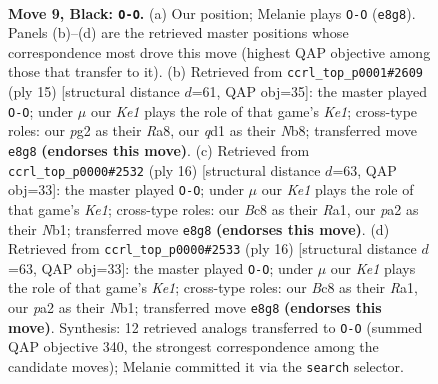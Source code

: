 \documentclass[11pt]{article}
\begin{document}
\clearpage

\begin{figure}[p]\centering
\begin{subfigure}{0.46\textwidth}\centering
\resizebox{\linewidth}{!}{%
\newchessgame
\chessboard[
  setfen={rnbqk2r/pp3pbp/1n1pp1p1/8/3P4/1B6/PPP2PPP/RNBQNRK1 b kq - 1 9},
  showmover=false,
  pgfstyle=straightmove, color=movearrow, markmove={e8-g8}
]}
\caption{}
\end{subfigure}\hfill
\begin{subfigure}{0.46\textwidth}\centering
\resizebox{\linewidth}{!}{%
\newchessgame
\chessboard[
  setfen={rn1qk2r/pp2bppp/2pp1n2/4p3/2P5/2N2BPP/PPQPPP2/R1B1K2R b KQkq - 0 8},
  showmover=false,
  pgfstyle=straightmove, color=movearrow, markmove={e8-g8}
]}
\caption{}
\end{subfigure}
\\[4pt]
\begin{subfigure}{0.46\textwidth}\centering
\resizebox{\linewidth}{!}{%
\newchessgame
\chessboard[
  setfen={rn1qkb1r/pb1p1ppp/1p6/2pn4/8/5NP1/PPQ1PPBP/RNB1K2R w KQkq - 0 9},
  showmover=false,
  pgfstyle=straightmove, color=movearrow, markmove={e1-g1}
]}
\caption{}
\end{subfigure}\hfill
\begin{subfigure}{0.46\textwidth}\centering
\resizebox{\linewidth}{!}{%
\newchessgame
\chessboard[
  setfen={rn1qkb1r/pb1p1ppp/1p6/2pn4/8/5NP1/PPQ1PPBP/RNB1K2R w KQkq - 0 9},
  showmover=false,
  pgfstyle=straightmove, color=movearrow, markmove={e1-g1}
]}
\caption{}
\end{subfigure}
\caption{\textbf{Move 9, Black: \texttt{O-O}.} (a) Our position; Melanie plays \texttt{O-O} (\texttt{e8g8}). Panels (b)--(d) are the retrieved master positions whose correspondence most drove this move (highest QAP objective among those that transfer to it). (b) Retrieved from \texttt{ccrl\_top\_p0001\#2609} (ply 15) [structural distance $d$=61, QAP obj=35]: the master played \texttt{O-O}; under $\mu$ our \emph{Ke1} plays the role of that game's \emph{Ke1}; cross-type roles: our \emph{p}g2 as their \emph{R}a8, our \emph{q}d1 as their \emph{N}b8; transferred move \texttt{e8g8} \textbf{(endorses this move)}. (c) Retrieved from \texttt{ccrl\_top\_p0000\#2532} (ply 16) [structural distance $d$=63, QAP obj=33]: the master played \texttt{O-O}; under $\mu$ our \emph{Ke1} plays the role of that game's \emph{Ke1}; cross-type roles: our \emph{B}c8 as their \emph{R}a1, our \emph{p}a2 as their \emph{N}b1; transferred move \texttt{e8g8} \textbf{(endorses this move)}. (d) Retrieved from \texttt{ccrl\_top\_p0000\#2533} (ply 16) [structural distance $d$=63, QAP obj=33]: the master played \texttt{O-O}; under $\mu$ our \emph{Ke1} plays the role of that game's \emph{Ke1}; cross-type roles: our \emph{B}c8 as their \emph{R}a1, our \emph{p}a2 as their \emph{N}b1; transferred move \texttt{e8g8} \textbf{(endorses this move)}. Synthesis: 12 retrieved analogs transferred to \texttt{O-O} (summed QAP objective 340, the strongest correspondence among the candidate moves); Melanie committed it via the \texttt{search} selector.}
\label{fig:thought-m17}
\end{figure}
\end{document}
